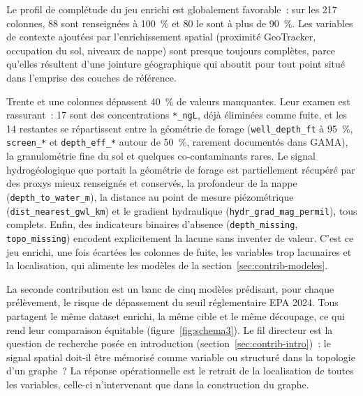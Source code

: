 Le profil de compl\'etude du jeu enrichi est globalement favorable~: sur les 217 colonnes, 88 sont renseign\'ees \`a 100~\% et 80 le sont \`a plus de 90~\%. Les variables de contexte ajout\'ees par l'enrichissement spatial (proximit\'e GeoTracker, occupation du sol, niveaux de nappe) sont presque toujours compl\`etes, parce qu'elles r\'esultent d'une jointure g\'eographique qui aboutit pour tout point situ\'e dans l'emprise des couches de r\'ef\'erence.

Trente et une colonnes d\'epassent 40~\% de valeurs manquantes. Leur examen est rassurant~: 17 sont des concentrations \texttt{*\_ngL}, d\'ej\`a \'elimin\'ees comme fuite, et les 14 restantes se r\'epartissent entre la g\'eom\'etrie de forage (\texttt{well\_depth\_ft} \`a 95~\%, \texttt{screen\_*} et \texttt{depth\_eff\_*} autour de 50~\%, rarement document\'es dans GAMA), la granulom\'etrie fine du sol et quelques co-contaminants rares. Le signal hydrog\'eologique que portait la g\'eom\'etrie de forage est partiellement r\'ecup\'er\'e par des proxys mieux renseign\'es et conserv\'es, la profondeur de la nappe (\texttt{depth\_to\_water\_m}), la distance au point de mesure pi\'ezom\'etrique (\texttt{dist\_nearest\_gwl\_km}) et le gradient hydraulique (\texttt{hydr\_grad\_mag\_permil}), tous complets. Enfin, des indicateurs binaires d'absence (\texttt{depth\_missing}, \texttt{topo\_missing}) encodent explicitement la lacune sans inventer de valeur. C'est ce jeu enrichi, une fois \'ecart\'ees les colonnes de fuite, les variables trop lacunaires et la localisation, qui alimente les mod\`eles de la section~\ref{sec:contrib-modeles}.


\label{sec:contrib-modeles}

La seconde contribution est un banc de cinq mod\`eles pr\'edisant, pour chaque pr\'el\`evement, le risque de d\'epassement du seuil r\'eglementaire EPA 2024. Tous partagent le m\^eme dataset enrichi, la m\^eme cible et le m\^eme d\'ecoupage, ce qui rend leur comparaison \'equitable (figure~\ref{fig:schema3}). Le fil directeur est la question de recherche pos\'ee en introduction (section~\ref{sec:contrib-intro})~: le signal spatial doit-il \^etre m\'emoris\'e comme variable ou structur\'e dans la topologie d'un graphe~? La r\'eponse op\'erationnelle est le retrait de la localisation de toutes les variables, celle-ci n'intervenant que dans la construction du graphe.

